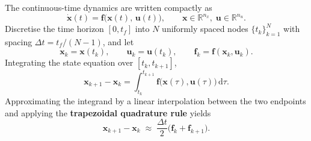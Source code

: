 \documentclass[../main.tex]{subfiles}
\begin{document}
The continuous-time dynamics are written compactly as
\begin{equation}
    \dot{\mathbf{x}}(t) = \mathbf{f}\bigl(\mathbf{x}(t),\, \mathbf{u}(t)\bigr),
    \qquad \mathbf{x}\in\mathbb{R}^{n_x},\; \mathbf{u}\in\mathbb{R}^{n_u}.
\end{equation}
Discretise the time horizon $[0, t_f]$ into $N$ uniformly spaced nodes $\{t_k\}_{k=1}^{N}$ with spacing $\Delta t = t_f/(N-1)$, and let
\begin{equation}
    \mathbf{x}_k = \mathbf{x}(t_k),\qquad \mathbf{u}_k = \mathbf{u}(t_k),\qquad
    \mathbf{f}_k = \mathbf{f}(\mathbf{x}_k, \mathbf{u}_k).
\end{equation}
Integrating the state equation over $[t_k, t_{k+1}]$,
\begin{equation}
    \mathbf{x}_{k+1} - \mathbf{x}_k = \int_{t_k}^{t_{k+1}} \mathbf{f}\bigl(\mathbf{x}(\tau),\mathbf{u}(\tau)\bigr)\,\mathrm{d}\tau.
\end{equation}
Approximating the integrand by a linear interpolation between the two endpoints and applying the \textbf{trapezoidal quadrature rule} yields
\begin{equation}
    \mathbf{x}_{k+1} - \mathbf{x}_k \;\approx\; \frac{\Delta t}{2}\bigl(\mathbf{f}_k + \mathbf{f}_{k+1}\bigr).
    \label{eq:trap_rule}
\end{equation}
\end{document}
